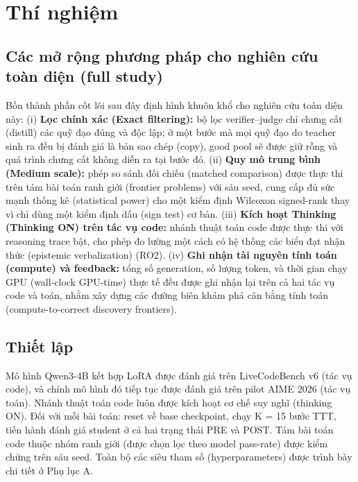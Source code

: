 \chapter{Thí nghiệm}\label{chapter-4-experiments}

\section{Các mở rộng phương pháp cho nghiên cứu toàn diện (full study)}\label{method-extensions-for-the-full-study}

Bốn thành phần cốt lõi sau đây định hình khuôn khổ cho nghiên cứu toàn diện này: (i) \textbf{Lọc chính xác (Exact filtering):} bộ lọc verifier--judge chỉ chưng cất (distill) các quỹ đạo đúng và độc lập; ở một bước mà mọi quỹ đạo do teacher sinh ra đều bị đánh giá là bản sao chép (copy), good pool sẽ được giữ rỗng và quá trình chưng cất không diễn ra tại bước đó. (ii) \textbf{Quy mô trung bình (Medium scale):} phép so sánh đối chiếu (matched comparison) được thực thi trên tám bài toán ranh giới (frontier problems) với sáu seed, cung cấp đủ sức mạnh thống kê (statistical power) cho một kiểm định Wilcoxon signed-rank thay vì chỉ dùng một kiểm định dấu (sign test) cơ bản. (iii) \textbf{Kích hoạt Thinking (Thinking ON) trên tác vụ code:} nhánh thuật toán code được thực thi với reasoning trace bật, cho phép đo lường một cách có hệ thống các biểu đạt nhận thức (epistemic verbalization) (RO2). (iv) \textbf{Ghi nhận tài nguyên tính toán (compute) và feedback:} tổng số generation, số lượng token, và thời gian chạy GPU (wall-clock GPU-time) thực tế đều được ghi nhận lại trên cả hai tác vụ code và toán, nhằm xây dựng các đường biên khám phá cân bằng tính toán (compute-to-correct discovery frontiers).

\section{Thiết lập}\label{setup}

Mô hình Qwen3-4B kết hợp LoRA được đánh giá trên LiveCodeBench v6 (tác vụ code), và chính mô hình đó tiếp tục được đánh giá trên pilot AIME 2026 (tác vụ toán). Nhánh thuật toán code luôn được kích hoạt cơ chế suy nghĩ (thinking ON). Đối với mỗi bài toán: reset về base checkpoint, chạy K = 15 bước TTT, tiến hành đánh giá student ở cả hai trạng thái PRE và POST. Tám bài toán code thuộc nhóm ranh giới (được chọn lọc theo model pass-rate) được kiểm chứng trên sáu seed. Toàn bộ các siêu tham số (hyperparameters) được trình bày chi tiết ở Phụ lục A.

